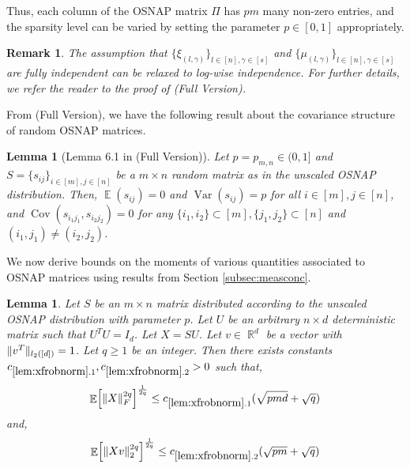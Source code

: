 \documentclass[11pt]{amsart}
\numberwithin{equation}{section}
\numberwithin{equation}{section}
\DeclareMathOperator{\E}{\mathbb{E}}
\DeclareMathOperator{\R}{\mathbb{R}}
\DeclareMathOperator{\cov}{Cov}
\DeclarePairedDelimiter{\norm}{\lVert}{\rVert}
\DeclarePairedDelimiter{\sqbr}{[}{]}
\newtheorem{lemma}[theorem]{Lemma}
\newtheorem{remark}[theorem]{Remark}
\begin{document}
 Thus, each column of the OSNAP matrix $\Pi$ has $pm$ many non-zero entries, and the sparsity level can be varied by setting the parameter $p \in [0,1]$ appropriately.

 \begin{remark}
     The assumption that $\{ \xi_{(l,\gamma)} \}_{l \in [n], \gamma \in [s]}$ and $\{ \mu_{(l,\gamma)} \}_{l \in [n], \gamma \in [s]}$ are fully independent can be relaxed to log-wise independence. For further details, we refer the reader to the proof of \cite[Theorem 3.2]{chenakkod2025optimal} (Full Version).
 \end{remark}

From \cite{chenakkod2025optimal} (Full Version), we have the following result about the covariance structure of random OSNAP matrices.

\begin{lemma}[Lemma 6.1 in \cite{chenakkod2025optimal} (Full Version)] 
Let $p = p_{m,n} \in (0,1]$ and $S=\{s_{ij}\}_{i \in [m], j \in [n]}$ be a $m \times n$ random matrix as in the unscaled OSNAP distribution. Then, $\E(s_{ij})=0$ and $\operatorname{Var}(s_{ij})=p$ for all $i \in [m], j \in [n]$, and $\cov(s_{i_1 j_1},s_{i_2 j_2})=0$ for any $\{i_1,i_2\} \subset [m], \{j_1,j_2\} \subset [n]$ and $ (i_1,j_1)\neq (i_2,j_2) $.
\end{lemma}

We now derive bounds on the moments of various quantities associated to OSNAP matrices using results from Section \ref{subsec:measconc}.

\begin{lemma}\label{lem:xfrobnorm}
    Let $S$ be an $m \times n$ matrix distributed according to the unscaled OSNAP distribution with parameter $p$. Let $U$ be an arbitrary $n \times d$ deterministic matrix such that $U^TU=I_d$. Let $X=SU$. Let $v \in \R^d$ be a vector with $\norm{v^T}_{l_2([d])}=1$. Let $q \ge 1$ be an integer. Then there exists constants $c_{\ref{lem:xfrobnorm}.1}, c_{\ref{lem:xfrobnorm}.2} > 0$ such that,
    \[ \E \sqbr*{\norm{X}^{2q}_F}^\frac{1}{2q} \le c_{\ref{lem:xfrobnorm}.1}(\sqrt{pmd} + \sqrt{q}) \]
    and,
    \[ \E \sqbr*{\norm{Xv}^{2q}_2}^\frac{1}{2q} \le c_{\ref{lem:xfrobnorm}.2}(\sqrt{pm} + \sqrt{q}) \]
\end{lemma}
\end{document}
